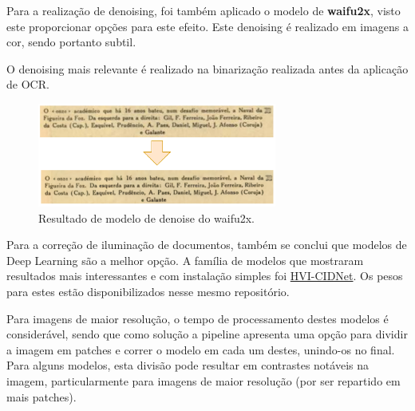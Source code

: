 
Para a realização de denoising, foi também aplicado o modelo de \textbf{waifu2x}, visto este proporcionar opções para este efeito. Este denoising é realizado em imagens a cor, sendo portanto subtil.

O denoising mais relevante é realizado na binarização realizada antes da aplicação de OCR.

\begin{figure}[H]
	\centering
	\includegraphics[width=0.7\textwidth]{images/ilustracoes/denoise_example.png}
	\caption{Resultado de modelo de denoise do waifu2x.}
	\label{fig:denoise_example}
\end{figure}




Para a correção de iluminação de documentos, também se conclui que modelos de Deep Learning são a melhor opção. A família de modelos que mostraram resultados mais interessantes e com instalação simples foi \href{https://github.com/Fediory/HVI-CIDNet}{HVI-CIDNet}. Os pesos para estes estão disponibilizados nesse mesmo repositório.

Para imagens de maior resolução, o tempo de processamento destes modelos é considerável, sendo que como solução a pipeline apresenta uma opção para dividir a imagem em patches e correr o modelo em cada um destes, unindo-os no final. Para alguns modelos, esta divisão pode resultar em contrastes notáveis na imagem, particularmente para imagens de maior resolução (por ser repartido em mais patches).


